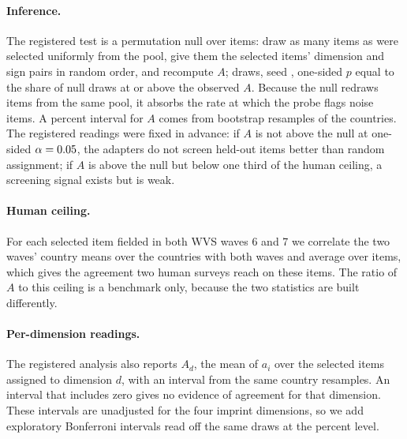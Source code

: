 \paragraph{Inference.} The registered test is a permutation null over items: draw as many items as were selected uniformly from the pool, give them the selected items' dimension and sign pairs in random order, and recompute $A$;  draws, seed , one-sided $p$ equal to the share of null draws at or above the observed $A$. Because the null redraws items from the same pool, it absorbs the rate at which the probe flags noise items. A  percent interval for $A$ comes from  bootstrap resamples of the  countries. The registered readings were fixed in advance: if $A$ is not above the null at one-sided $\alpha=\dc{0.05}{alpha}$, the adapters do not screen held-out items better than random assignment; if $A$ is above the null but below one third of the human ceiling, a screening signal exists but is weak.

\paragraph{Human ceiling.} For each selected item fielded in both WVS waves 6 and 7 we correlate the two waves' country means over the  countries with both waves \citep{wvsts2022} and average over items, which gives the agreement two human surveys reach on these items. The ratio of $A$ to this ceiling is a benchmark only, because the two statistics are built differently.

\paragraph{Per-dimension readings.} The registered analysis also reports $A_d$, the mean of $a_i$ over the selected items assigned to dimension $d$, with an interval from the same country resamples. An interval that includes zero gives no evidence of agreement for that dimension. These intervals are unadjusted for the four imprint dimensions, so we add exploratory Bonferroni intervals read off the same draws at the  percent level.

